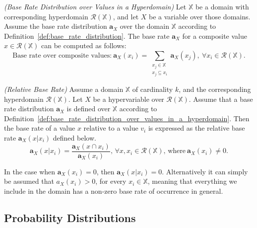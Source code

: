 \begin{definition}\label{def:base_rate_distribution_over_values_in_a_hyperdomain}
	\emph{(Base Rate Distribution over Values in a Hyperdomain)} Let $\mathbb{X}$ be a domain with corresponding hyperdomain $\mathcal{R}(\mathbb{X})$, and let $X$ be a variable over those domains. Assume the base rate distribution $\mathbf{a}_X$ over the domain $\mathbb{X}$ according to Definition~\ref{def:base_rate_distribution}. The base rate $\mathbf{a}_X$ for a composite value $x \in \mathcal{R}(\mathbb{X})$ can be computed as follows:
	\begin{equation}
		\text{Base rate over composite values:}\ \mathbf{a}_X(x_i) = \sum\limits_{\substack{x_j \in \mathbb{X} \\ x_j \subseteq x_i}} \mathbf{a}_X(x_j),\ \forall x_i \in \mathcal{R}(\mathbb{X})\text{.}
	\end{equation}
\end{definition}

\begin{definition}
	\emph{(Relative Base Rate)} Assume a domain $\mathbb{X}$ of cardinality $k$, and the corresponding hyperdomain $\mathcal{R}(\mathbb{X})$. Let $X$ be a hypervariable over $\mathcal{R}(\mathbb{X})$. Assume that a base rate distribution $\mathbf{a}_X$ is defined over $\mathbb{X}$ according to Definition~\ref{def:base_rate_distribution_over_values_in_a_hyperdomain}. Then the base rate of a value $x$ relative to a value $v_i$ is expressed as the relative base rate $\mathbf{a}_X(x|x_i)$ defined below.
	\begin{equation}
		\mathbf{a}_X(x|x_i) = \dfrac{\mathbf{a}_X(x \cap x_i)}{\mathbf{a}_X(x_i)}\text{, } \forall x, x_i \in \mathcal{R}(\mathbb{X}) \text{, where}\ \mathbf{a}_X(x_i) \neq 0\text{.}
	\end{equation}

	In the case when $\mathbf{a}_X(x_i) = 0$, then $\mathbf{a}_X(x|x_i) = 0$. Alternatively it can simply be assumed that $a_X(x_i) > 0$, for every $x_i \in \mathbb{X}$, meaning that everything we include in the domain has a non-zero base rate of occurrence in general.
\end{definition}

\subsection{Probability Distributions}

